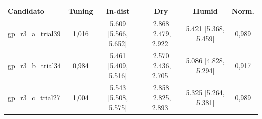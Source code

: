 \begin{tabular}{l c c c c c}
\hline
\textbf{Candidato} & \textbf{Tuning} & \textbf{In-dist} & \textbf{Dry} & \textbf{Humid} & \textbf{Norm.} \\ \hline
gp\_r3\_a\_trial39 & 1,016 & 5.609 [5.566, 5.652] & 2.868 [2.479, 2.922] & 5.421 [5.368, 5.459] & 0,989 \\
gp\_r3\_b\_trial34 & 0,984 & 5.461 [5.409, 5.516] & 2.570 [2.436, 2.705] & 5.086 [4.828, 5.294] & 0,917 \\
gp\_r3\_c\_trial27 & 1,004 & 5.543 [5.508, 5.575] & 2.858 [2.825, 2.893] & 5.325 [5.264, 5.381] & 0,989 \\
\hline
\end{tabular}
